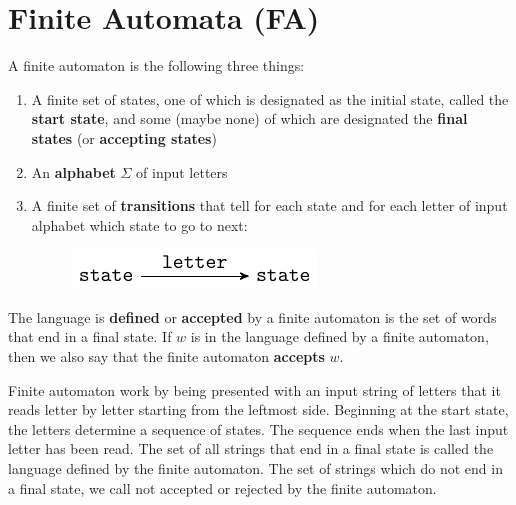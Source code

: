 \section{Finite Automata (FA)}
A finite automaton is the following three things:
\begin{enumerate}
    \item A finite set of states, one of which is designated as the initial state, called the \textbf{start state}, and some (maybe none) of which are designated the \textbf{final states} (or \textbf{accepting states})
    \item An \textbf{alphabet} \(\Sigma\) of input letters
    \item A finite set of \textbf{transitions} that tell for each state and for each letter of input alphabet which state to go to next:
    \begin{figure}[h!]
        \centering
        \includegraphics[]{lectures/figures/basic_fa.pdf}
    \end{figure}
\end{enumerate}
The language is \textbf{defined} or \textbf{accepted} by a finite automaton is the set of words that end in a final state.
If \(w\) is in the language defined by a finite automaton, then we also say that the finite automaton \textbf{accepts} \(w\).

Finite automaton work by being presented with an input string of letters that it reads letter by letter starting from the leftmost side.
Beginning at the start state, the letters determine a sequence of states.
The sequence ends when the last input letter has been read.
The set of all strings that end in a final state is called the language defined by the finite automaton.
The set of strings which do not end in a final state, we call not accepted or rejected by the finite automaton.

